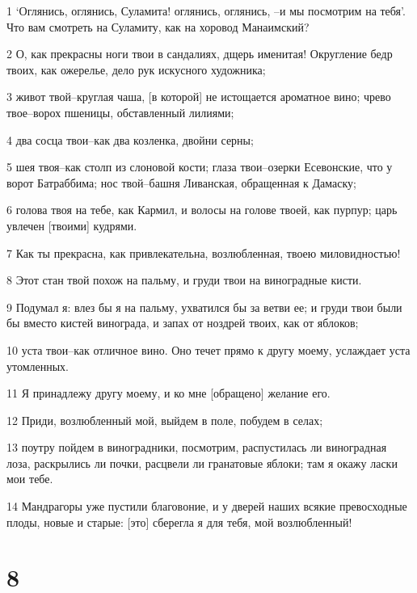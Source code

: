 \par 1 `Оглянись, оглянись, Суламита! оглянись, оглянись, --и мы посмотрим на тебя'. Что вам смотреть на Суламиту, как на хоровод Манаимский?
\par 2 О, как прекрасны ноги твои в сандалиях, дщерь именитая! Округление бедр твоих, как ожерелье, дело рук искусного художника;
\par 3 живот твой--круглая чаша, [в которой] не истощается ароматное вино; чрево твое--ворох пшеницы, обставленный лилиями;
\par 4 два сосца твои--как два козленка, двойни серны;
\par 5 шея твоя--как столп из слоновой кости; глаза твои--озерки Есевонские, что у ворот Батраббима; нос твой--башня Ливанская, обращенная к Дамаску;
\par 6 голова твоя на тебе, как Кармил, и волосы на голове твоей, как пурпур; царь увлечен [твоими] кудрями.
\par 7 Как ты прекрасна, как привлекательна, возлюбленная, твоею миловидностью!
\par 8 Этот стан твой похож на пальму, и груди твои на виноградные кисти.
\par 9 Подумал я: влез бы я на пальму, ухватился бы за ветви ее; и груди твои были бы вместо кистей винограда, и запах от ноздрей твоих, как от яблоков;
\par 10 уста твои--как отличное вино. Оно течет прямо к другу моему, услаждает уста утомленных.
\par 11 Я принадлежу другу моему, и ко мне [обращено] желание его.
\par 12 Приди, возлюбленный мой, выйдем в поле, побудем в селах;
\par 13 поутру пойдем в виноградники, посмотрим, распустилась ли виноградная лоза, раскрылись ли почки, расцвели ли гранатовые яблоки; там я окажу ласки мои тебе.
\par 14 Мандрагоры уже пустили благовоние, и у дверей наших всякие превосходные плоды, новые и старые: [это] сберегла я для тебя, мой возлюбленный!

\chapter{8}

